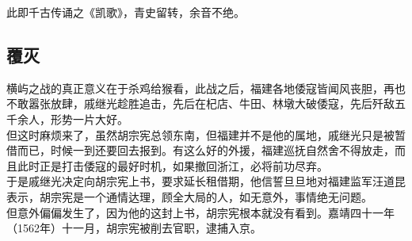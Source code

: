 \begin{multicols}{\theparacolNo}
此即千古传诵之《凯歌》，青史留转，余音不绝。\\

\subsection{覆灭}
横屿之战的真正意义在于杀鸡给猴看，此战之后，福建各地倭寇皆闻风丧胆，再也不敢嚣张放肆，戚继光趁胜追击，先后在杞店、牛田、林墩大破倭寇，先后歼敌五千余人，形势一片大好。\\

但这时麻烦来了，虽然胡宗宪总领东南，但福建并不是他的属地，戚继光只是被暂借而已，时候一到还要回去报到。有这么好的外援，福建巡抚自然舍不得放走，而且此时正是打击倭寇的最好时机，如果撤回浙江，必将前功尽弃。\\

于是戚继光决定向胡宗宪上书，要求延长租借期，他信誓旦旦地对福建监军汪道昆表示，胡宗宪是一个通情达理，顾全大局的人，如无意外，事情绝无问题。\\

但意外偏偏发生了，因为他的这封上书，胡宗宪根本就没有看到。嘉靖四十一年（1562年）十一月，胡宗宪被削去官职，逮捕入京。\\
\ifnum{}
	\end{multicols}
\fi
\newpage
